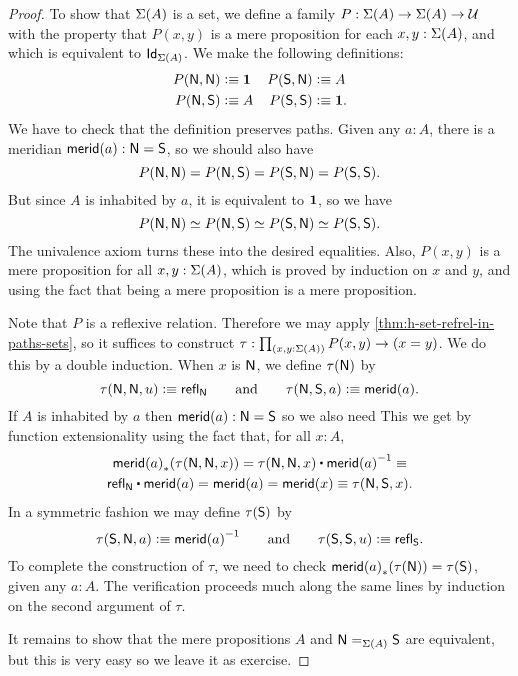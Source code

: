 \begin{proof}
To show that $\susp(A)$ is a set, we define a
family $P:\susp(A)\to\susp(A)\to\type$ with the 
property that $P(x,y)$ is a mere proposition for each $x,y:\susp(A)$,
and which is equivalent to $\idtypevar{\susp(A)}$.
%
We make the following definitions:
\begin{align*}
P(\north,\north) & \defeq \unit &
P(\south,\north) & \defeq A\\
P(\north,\south) & \defeq A &
P(\south,\south) & \defeq \unit.
\end{align*}
We have to check that the definition preserves paths.
Given any $a : A$, there is a meridian $\merid(a) : \north = \south$,
so we should also have
%
\begin{equation*}
  P(\north, \north) = P(\north, \south) = P(\south, \north) = P(\south, \south).
\end{equation*}
%
But since $A$ is inhabited by $a$, it is equivalent to $\unit$, so we have
%
\begin{equation*}
  P(\north, \north) \eqvsym P(\north, \south) \eqvsym P(\south, \north) \eqvsym P(\south, \south).
\end{equation*}
%
The univalence axiom turns these into the desired equalities. Also, $P(x,y)$ is a mere
proposition for all $x, y : \susp(A)$, which is proved by induction on $x$ and $y$, and
using the fact that being a mere proposition is a mere proposition.

Note that $P$ is a reflexive relation.
Therefore we may apply \autoref{thm:h-set-refrel-in-paths-sets}, so it suffices to
construct $\tau : \prd{x,y:\susp(A)}P(x,y)\to(x=y)$. We do this by a double induction.
When $x$ is $\north$, we define $\tau(\north)$ by
%
\begin{equation*}
  \tau(\north,\north,u) \defeq \refl{\north}
  \qquad\text{and}\qquad
  \tau(\north,\south,a) \defeq \merid(a).
\end{equation*}
%
If $A$ is inhabited by $a$ then $\merid(a) : \north = \south$ so we also need
This we get by function extensionality using the fact that, for all $x : A$,
%
\begin{multline*}
  \trans{\merid(a)}{\tau(\north,\north,x)} =
  \tau(\north,\north,x) \ct \opp{\merid(a)} \jdeq \\
  \refl{\north} \ct \merid(a) =
  \merid(a) =
  \merid(x) \jdeq
  \tau(\north, \south, x).
\end{multline*}
In a symmetric fashion we may define $\tau(\south)$ by
%
\begin{equation*}
  \tau(\south,\north, a) \defeq \opp{\merid(a)}
  \qquad\text{and}\qquad
  \tau(\south,\south, u) \defeq \refl{\south}.
\end{equation*}
%
To complete the construction of $\tau$, we need to check $\trans{\merid(a)}{\tau(\north)} = \tau(\south)$,
given any $a : A$. The verification proceeds much along the same lines by induction on the
second argument of $\tau$.

It remains to show that the mere propositions $A$ and $\id[\susp(A)]{\north}{\south}$ are
equivalent, but this is very easy so we leave it as exercise.
\end{proof}

